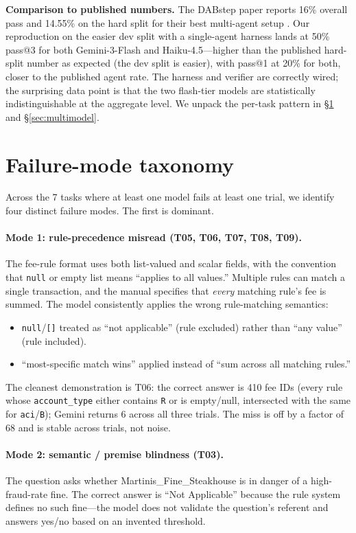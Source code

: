 \documentclass[11pt]{article}
\begin{document}
\textbf{Comparison to published numbers.} The DABstep paper reports 16\% overall pass and
14.55\% on the hard split for their best multi-agent setup \cite{dabstep2025}. Our reproduction
on the easier dev split with a single-agent harness lands at 50\% pass@3 for both
Gemini-3-Flash and Haiku-4.5---higher than the published hard-split number as expected
(the dev split is easier), with pass@1 at 20\% for both, closer to the published agent rate.
The harness and verifier are correctly wired; the surprising data point is that the two flash-tier
models are statistically indistinguishable at the aggregate level. We unpack the per-task
pattern in \S\ref{sec:failures} and \S\ref{sec:multimodel}.

\section{Failure-mode taxonomy}
\label{sec:failures}

Across the 7 tasks where at least one model fails at least one trial, we identify four
distinct failure modes. The first is dominant.

\paragraph{Mode 1: rule-precedence misread (T05, T06, T07, T08, T09).} The fee-rule format
uses both list-valued and scalar fields, with the convention that \texttt{null} or empty list
means ``applies to all values.'' Multiple rules can match a single transaction, and the
manual specifies that \emph{every} matching rule's fee is summed. The model consistently
applies the wrong rule-matching semantics:
\begin{itemize}[topsep=0pt,itemsep=0pt]
  \item \texttt{null}/\texttt{[]} treated as ``not applicable'' (rule excluded) rather than
        ``any value'' (rule included).
  \item ``most-specific match wins'' applied instead of ``sum across all matching rules.''
\end{itemize}
The cleanest demonstration is T06: the correct answer is 410 fee IDs (every rule whose
\texttt{account\_type} either contains \texttt{R} or is empty/null, intersected with the same
for \texttt{aci}/\texttt{B}); Gemini returns 6 across all three trials. The miss is off by a
factor of 68 and is stable across trials, not noise.

\paragraph{Mode 2: semantic / premise blindness (T03).} The question asks whether
Martinis\_Fine\_Steakhouse is in danger of a high-fraud-rate fine. The correct answer is
``Not Applicable'' because the rule system defines no such fine---the model does not validate
the question's referent and answers yes/no based on an invented threshold.
\end{document}
